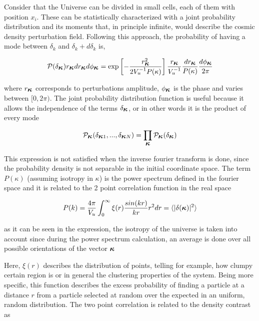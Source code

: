 Consider that the Universe can be divided in small cells, each of them with position 
$x_i$. These can be statistically characterized with a joint probability 
distribution and its moments that, in principle infinite, would describe the 
cosmic density perturbation field. 
Following this approach, the probability of having a mode between $\delta_k$ and 
$\delta_{k}+d\delta_k$ is, 

\begin{equation}
\mathcal{P}(\delta_{\mbox{\boldmath$\kappa$}})r_{\mbox{\boldmath$\kappa$}}dr_{\mbox{\boldmath$\kappa$}}d\phi_{\mbox{\boldmath$\kappa$}}
=
\exp\left[-\frac{r_{\mbox{\boldmath$\kappa$}}^2}{2V_u^{-1}P(\kappa)}\right]	\frac{r_{\mbox{\boldmath$\kappa$}}}{V_u^{-1}}
\frac{dr_{\mbox{\boldmath$\kappa$}}}{P(\kappa)}\frac{d\phi_{\mbox{\boldmath$\kappa$}}}{2\pi}
\label{probabilidad}
\end{equation}


where $r_{\mbox{\boldmath$\kappa$}}$ corresponds to perturbations amplitude,  $\phi_{\mbox{\boldmath$\kappa$}}$ 
is the phase and varies between $[0,2\pi)$. The joint probability distribution function 
is useful because it allows the independence of the terms $\delta_{\mbox{\boldmath$\kappa$}}$, 
or in other words it is the product of every mode

\[
\mathcal{P}_{\mbox{\boldmath$\kappa$}}(\delta_{\mbox{\boldmath$\kappa$}1},...,\delta_{\mbox{\boldmath$\kappa$}N})=
\prod_{\mbox{\boldmath$\kappa$}}\mathcal{P}_{\mbox{\boldmath$\kappa$}}(\delta_{\mbox{\boldmath$\kappa$}})
\]


This expression is not satisfied when the inverse fourier transform is done, since the 
probability density is not separable in the initial coordinate space. The term $P(\kappa)$ 
(assuming isotropy in \mbox{\boldmath$\kappa$}) is the power spectrum defined in the 
fourier space and it is related to the 2 point correlation function in the real space

\begin{equation}
P(k) = \frac{4\pi}{V_u}\int_0^\infty \xi (r)\frac{sin(kr)}{kr}r^2dr =  \langle|\delta(\mbox{\boldmath$\kappa$})|^2\rangle
\label{pk}
\end{equation}

as it can be seen in the expression, the isotropy of the universe is taken into account since during the power spectrum calculation, an average is done over all  possible orientations of the vector ${\mbox{\boldmath$\kappa$}}$

Here, $\xi (r)$  describes the distribution of points, telling for example, how clumpy certain region is or in general the clustering properties of the system. Being more specific, this function describes the excess probability of finding a particle at a distance $r$ from a particle selected at random over the expected in an uniform, random distribution. 
The two point correlation is related to the density contrast as


